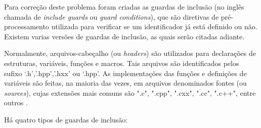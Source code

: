 Para correção deste problema foram criadas as guardas de inclusão 
(no inglês chamada de  \textit{include guards} ou \textit{guard conditions}),
 que são diretivas de pré-processamento utilizada para verificar se um
 identificador já está definido ou não. Existem varias versões de guardas
 de inclusão, as quais serão citadas adiante\cite{ref42}.

Normalmente, arquivos-cabeçalho (ou \textit{headers}) são utilizados para
 declarações de estruturas, variáveis, funções e macros. Tais arquivos são
 identificados pelos sufixo ‘.h’,’.hpp’,’.hxx’ ou ‘.hpp’. As implementações
 das funções e definições de variáveis são feitas, na maioria das vezes, em
 arquivos denominados fontes (ou \textit{sources}), cujas extensões mais
 comuns são ".c", ".cpp", ".cxx", ".cc", ".c++", entre outros
 \cite{gcc-sufix}.

Há quatro tipos de guardas de inclusão:


